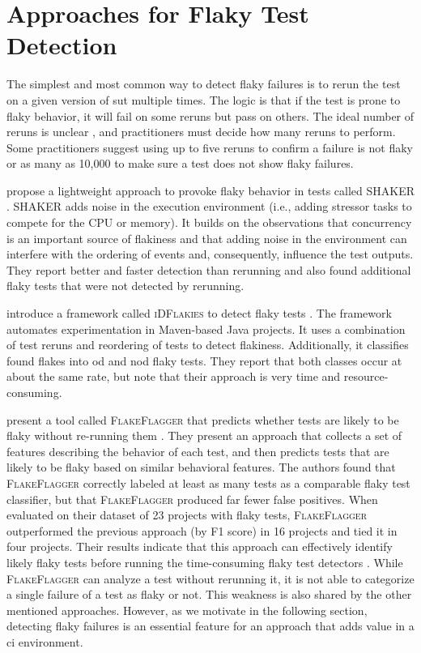 \section{Approaches for Flaky Test Detection}
The simplest and most common way to detect flaky failures is to rerun the test on a given version of \ac{sut} multiple times.
The logic is that if the test is prone to flaky behavior, it will fail on some reruns but pass on others.
The ideal number of reruns is unclear \autocite{parry_survey_2021}, and practitioners must decide how many reruns to perform.
Some practitioners suggest using up to five reruns \autocite{lam_understanding_2020} to confirm a failure is not flaky or as many as 10,000 \autocite{alshammari_flakeflagger_2021} to make sure a test does not show flaky failures.

 propose a lightweight approach to provoke flaky behavior in tests called \textsc{SHAKER} \autocite{silva_shake_2020}.
\textsc{SHAKER} adds noise in the execution environment (i.e., adding stressor tasks to compete for the CPU or memory).
It builds on the observations that concurrency is an important source of flakiness and that adding noise in the environment can interfere with the ordering of events and, consequently, influence the test outputs.
They report better and faster detection than rerunning and also found additional flaky tests that were not detected by rerunning.

 introduce a framework called \textsc{iDFlakies} to detect flaky tests \autocite{lam_idflakies_2019}.
The framework automates experimentation in Maven-based Java projects.
It uses a combination of test reruns and reordering of tests to detect flakiness.
Additionally, it classifies found flakes into \ac{od} and \ac{nod} flaky tests.
They report that both classes occur at about the same rate, but note that their approach is very time and resource-consuming.

 present a tool called \textsc{FlakeFlagger} that predicts whether tests are likely to be flaky without re-running them \autocite{alshammari_flakeflagger_2021}.
They present an approach that collects a set of features describing the behavior of each test, and then predicts tests that are likely to be flaky based on similar behavioral features.
The authors found that \textsc{FlakeFlagger} correctly labeled at least as many tests as a comparable flaky test classifier, but that \textsc{FlakeFlagger} produced far fewer false positives.
When evaluated on their dataset of 23 projects with flaky tests, \textsc{FlakeFlagger} outperformed the previous approach (by F1 score) in 16 projects and tied it in four projects.
Their results indicate that this approach can effectively identify likely flaky tests before running the time-consuming flaky test detectors \autocite{alshammari_flakeflagger_2021}.
While \textsc{FlakeFlagger} can analyze a test without rerunning it, it is not able to categorize a single failure of a test as flaky or not.
This weakness is also shared by the other mentioned approaches.
However, as we motivate in the following section, detecting flaky failures is an essential feature for an approach that adds value in a \ac{ci} environment.

